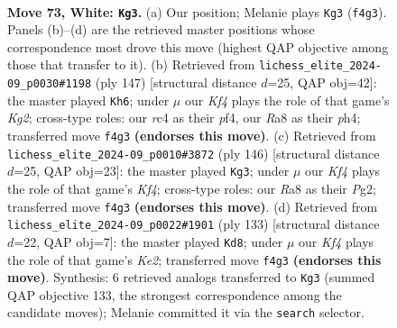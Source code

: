 \documentclass[11pt]{article}
\begin{document}
\clearpage

\begin{figure}[p]\centering
\begin{subfigure}{0.46\textwidth}\centering
\resizebox{\linewidth}{!}{%
\newchessgame
\chessboard[
  setfen={R7/5p2/3Rpk2/8/P1r1PK2/5P2/8/8 w - - 37 73},
  showmover=false,
  pgfstyle=straightmove, color=movearrow, markmove={f4-g3}
]}
\caption{}
\end{subfigure}\hfill
\begin{subfigure}{0.46\textwidth}\centering
\resizebox{\linewidth}{!}{%
\newchessgame
\chessboard[
  setfen={8/5pk1/8/4PK1p/5P1P/1R6/1p6/1r6 b - - 48 74},
  showmover=false,
  pgfstyle=straightmove, color=movearrow, markmove={g7-h6}
]}
\caption{}
\end{subfigure}
\\[4pt]
\begin{subfigure}{0.46\textwidth}\centering
\resizebox{\linewidth}{!}{%
\newchessgame
\chessboard[
  setfen={8/1R3pk1/6p1/7p/4PK1P/5P2/6P1/7r w - - 33 74},
  showmover=false,
  pgfstyle=straightmove, color=movearrow, markmove={f4-g3}
]}
\caption{}
\end{subfigure}\hfill
\begin{subfigure}{0.46\textwidth}\centering
\resizebox{\linewidth}{!}{%
\newchessgame
\chessboard[
  setfen={8/R3kp2/6p1/6P1/5K2/5P2/p7/r7 b - - 45 67},
  showmover=false,
  pgfstyle=straightmove, color=movearrow, markmove={e7-d8}
]}
\caption{}
\end{subfigure}
\caption{\textbf{Move 73, White: \texttt{Kg3}.} (a) Our position; Melanie plays \texttt{Kg3} (\texttt{f4g3}). Panels (b)--(d) are the retrieved master positions whose correspondence most drove this move (highest QAP objective among those that transfer to it). (b) Retrieved from \texttt{lichess\_elite\_2024-09\_p0030\#1198} (ply 147) [structural distance $d$=25, QAP obj=42]: the master played \texttt{Kh6}; under $\mu$ our \emph{Kf4} plays the role of that game's \emph{Kg2}; cross-type roles: our \emph{r}c4 as their \emph{p}f4, our \emph{R}a8 as their \emph{p}h4; transferred move \texttt{f4g3} \textbf{(endorses this move)}. (c) Retrieved from \texttt{lichess\_elite\_2024-09\_p0010\#3872} (ply 146) [structural distance $d$=25, QAP obj=23]: the master played \texttt{Kg3}; under $\mu$ our \emph{Kf4} plays the role of that game's \emph{Kf4}; cross-type roles: our \emph{R}a8 as their \emph{P}g2; transferred move \texttt{f4g3} \textbf{(endorses this move)}. (d) Retrieved from \texttt{lichess\_elite\_2024-09\_p0022\#1901} (ply 133) [structural distance $d$=22, QAP obj=7]: the master played \texttt{Kd8}; under $\mu$ our \emph{Kf4} plays the role of that game's \emph{Ke2}; transferred move \texttt{f4g3} \textbf{(endorses this move)}. Synthesis: 6 retrieved analogs transferred to \texttt{Kg3} (summed QAP objective 133, the strongest correspondence among the candidate moves); Melanie committed it via the \texttt{search} selector.}
\label{fig:thought-m144}
\end{figure}
\end{document}

